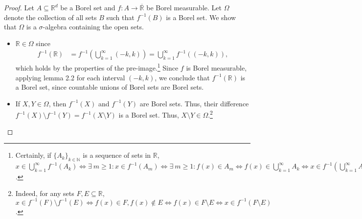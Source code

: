 \begin{proof}
Let \( A \subseteq \mathbb{R}^{d}  \) be a Borel set and \( f : A \to \overline{\mathbb{R}} \) be Borel measurable. Let \( \Omega \) denote the collection of all sets \( B \) such that \( f^{-1}(B)  \) is a Borel set. We show that \( \Omega \) is a \(\sigma\)-algebra containing the open sets.
\begin{itemize}
	\item \( \mathbb{R} \in \Omega \) since
		\begin{align*}
			f^{-1}(\mathbb{R})  &= f^{-1}\left ( {\bigcup_{k=1}^{\infty} (-k,k)} \right ) =  \bigcup_{k=1}^{\infty} f^{-1}((-k,k)),
		\end{align*}
		which holds by the properties of the pre-image.\footnote{Certainly, if \( \{ A_k \}_{k \in \mathbb{N} }  \) is a sequence of sets in \( \mathbb{R} \), \( x \in \bigcup_{k=1}^{\infty} f^{-1}( A_k) \iff \exists \ m \geq 1 : x \in f^{-1}(A_m) \iff \exists \ m \geq 1 : f(x) \in A_m \iff f(x) \in \bigcup_{k=1}^{\infty} A_k \iff x \in f^{-1}(\bigcup_{k=1}^{\infty} A_k)  \).} Since \( f \) is Borel measurable, applying lemma 2.2 for each interval \( (-k,k) \), we conclude that \( f^{-1}(\mathbb{R})   \) is a Borel set, since countable unions of Borel sets are Borel sets.	
\item If \( X, Y \in \Omega \), then \( f^{-1}(X) \) and \( f^{-1}(Y)  \) are Borel sets. Thus, their difference \( f^{-1}(X) \setminus f^{-1}(Y) = f^{-1}(X \setminus Y)    \) is a Borel set. Thus, \( X \setminus Y \in \Omega \).\footnote{Indeed, for any sets \( F,E \subseteq \mathbb{R} \), \( x \in f^{-1}(F) \setminus f^{-1}(E)  \iff f(x) \in F, f(x) \notin E \iff f(x) \in F\setminus E \iff x \in f^{-1}(F\setminus E) \).} 
	

\end{itemize}
\end{proof}
